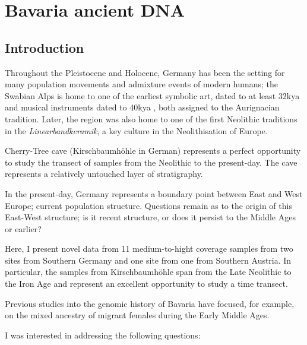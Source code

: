 \chapter{Bavaria ancient DNA}
\label{chapterlabel4}

\section{Introduction}

Throughout the Pleistocene and Holocene, Germany has been the setting for many population movements and admixture events of modern humans; the Swabian Alps is home to one of the earliest symbolic art, dated to at least 32kya \cite{conard2009female} and musical instruments dated to 40kya \cite{conard2009new}, both assigned to the Aurignacian tradition. Later, the region was also home to one of the first Neolithic traditions in the \textit{Linearbandkeramik}, a key culture in the Neolithisation of Europe. 

Cherry-Tree cave (Kirschbaumhöhle in German) represents a perfect opportunity to study the transect of samples from the Neolithic to the present-day. The cave represents a relatively untouched layer of stratigraphy.

In the present-day, Germany represents a boundary point between East and West Europe; current population structure. Questions remain as to the origin of this East-West structure; is it recent structure, or does it persist to the Middle Ages or earlier? 

Here, I present novel data from 11 medium-to-hight coverage samples from two sites from Southern Germany and one site from one from Southern Austria. In particular, the samples from Kirschbaumhöhle span from the Late Neolithic to the Iron Age and represent an excellent opportunity to study a time transect. 

Previous studies into the genomic history of Bavaria have focused, for example, on the mixed ancestry of migrant females during the Early Middle Ages. 

I was interested in addressing the following questions:

